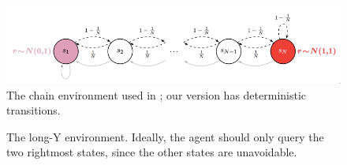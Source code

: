 \documentclass{article}
\begin{document}

\begin{figure}[t]
\setlength{\belowcaptionskip}{-20pt}
\centering
\includegraphics[width=.75\textwidth]{chain_figure.png}
\caption{The chain environment used in \citet{osband2016posterior}; our version has deterministic transitions.}
\label{fig:chain_env}
\end{figure}
\begin{figure}[t]
\centering
\resizebox{.55\textwidth}{!}{}
\caption{The long-Y environment. Ideally, the agent should only query the two rightmost states, since the other states are unavoidable.}
\label{fig:y_env}
\end{figure}
\end{document}
